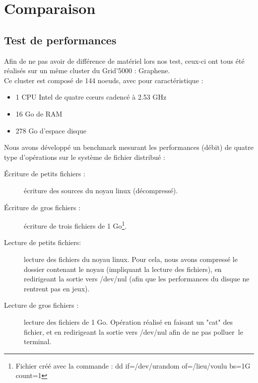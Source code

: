 \documentclass[12pt]{report}
\begin{document}
	\chapter{Comparaison}
		\section{Test de performances}
			Afin de ne pas avoir de différence de matériel lors nos test, ceux-ci ont tous été réalisés sur un même cluster du Grid'5000 : Graphene.\\

			Ce cluster est composé de 144 noeuds, avec pour caractéristique :
			\begin{itemize}
				\item 1 CPU Intel de quatre cœurs cadencé à 2.53 GHz
				\item 16 Go de RAM
				\item 278 Go d'espace disque\\
			\end{itemize}

			Nous avons développé un benchmark mesurant les performances (débit) de quatre type d'opérations sur le système de fichier distribué :
			\begin{description}
				\item[Écriture de petits fichiers :] écriture des sources du noyau linux (décompressé).
				\item[Écriture de gros fichiers :] écriture de trois fichiers de 1 Go\footnote{Fichier créé avec la commande : dd if=/dev/urandom of=/lieu/voulu bs=1G count=1}.
				\item[Lecture de petits fichiers: ] lecture des fichiers du noyau linux.
				Pour cela, nous avons compressé le dossier contenant le noyau (impliquant la lecture des fichiers),
				en redirigeant la sortie vers /dev/nul (afin que les performances du disque ne rentrent pas en jeux).
				\item[Lecture de gros fichiers :] lecture des fichiers de 1 Go. Opération réalisé en faisant un "cat" des fichier,
				et en redirigeant la sortie vers /dev/nul afin de ne pas \og polluer\fg~le terminal.\\
			\end{description}
\end{document}
